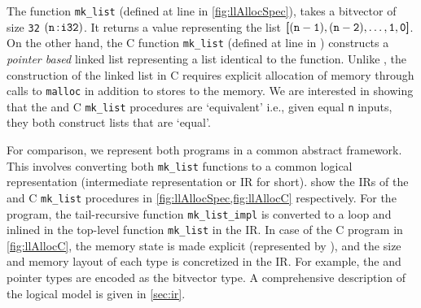 The \SpecL{} function {\tt mk\_list} (defined at line  in \cref{fig:llAllocSpec}), takes
a bitvector of size {\tt 32} $({\tt n}{{\,\tt :\!i32}})$.
It returns a  value representing the list ${\tt \bm{[} (n-1),(n-2),\dots,1,0 \bm{]}}$.
On the other hand, the C function {\tt mk\_list} (defined at line  in )
constructs a {\em pointer based} linked list representing a list identical to the \SpecL{} function.
Unlike \SpecL{}, the construction of the linked list in C requires explicit allocation of memory through calls to {\tt malloc}
in addition to stores to the memory.
We are interested in showing that the \SpecL{} and C {\tt mk\_list} procedures are `equivalent'
i.e., given equal {\tt n} inputs, they both construct lists that are `equal'.



For comparison, we represent both programs in a common abstract framework.
This involves converting both {\tt mk\_list} functions to a common logical representation
(intermediate representation or IR for short).
 show the IRs of the \SpecL{} and C {\tt mk\_list}
procedures in \cref{fig:llAllocSpec,fig:llAllocC} respectively.
For the \SpecL{} program, the tail-recursive function {\tt mk\_list\_impl} is converted to a loop
and inlined in the top-level function {\tt mk\_list} in the IR.
In case of the C program in \cref{fig:llAllocC}, the memory state is made explicit (represented by \mem{}),
and the size and memory layout of each type is concretized in the IR.
For example, the  and pointer types are encoded as the  bitvector type.
A comprehensive description of the logical model is given in \cref{sec:ir}. 

